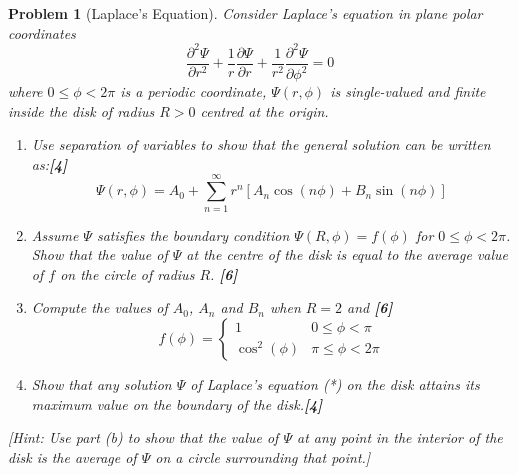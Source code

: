 \documentclass[a4paper]{article}
\theoremstyle{new}
\newtheorem{qns}{Problem}[section]
\begin{document}
\begin{qns}[Laplace's Equation]
Consider Laplace’s equation in plane polar coordinates
\begin{equation}
    \frac{\partial^2\Psi}{\partial r^2}+\frac{1}{r}\frac{\partial\Psi}{\partial r}+\frac{1}{r^2}\frac{\partial^2\Psi}{\partial\phi^2}=0\tag{*}
    \end{equation}
where $0\leq\phi<2\pi$ is a periodic coordinate, $\Psi(r,\phi)$ is single-valued and finite inside the disk of radius $R > 0$ centred at the origin.
\begin{enumerate}[label=(\alph*)]
\item Use separation of variables to show that the general solution can be written as:\hfill\textbf{[4]}
$$\Psi(r,\phi)=A_0+\sum_{n=1}^\infty r^n[A_n\cos(n\phi)+B_n\sin(n\phi)]$$
\item Assume $\Psi$ satisfies the boundary condition $\Psi(R, \phi) = f(\phi)$ for $0\leq\phi<2\pi$. Show that the value of $\Psi$ at the centre of the disk is equal to the average value of $f$ on the circle of radius $R$. \hfill\textbf{[6]}
\item Compute the values of $A_0$, $A_n$ and $B_n$ when $R = 2$ and \hfill\textbf{[6]}
$$f(\phi)=
\left\{
        \begin{array}{ll}
      1 & 0\leq\phi<\pi \\
      \cos^2(\phi) & \pi\leq\phi<2\pi 
        \end{array}
    \right.$$
\item Show that any solution $\Psi$ of Laplace’s equation (*) on the disk attains its maximum value on the boundary of the disk.\hfill\textbf{[4]}
\end{enumerate}
[Hint: Use part (b) to show that the value of $\Psi$ at any point in the interior of the disk is the average of $\Psi$ on a circle surrounding that point.]
\end{qns}
\end{document}
